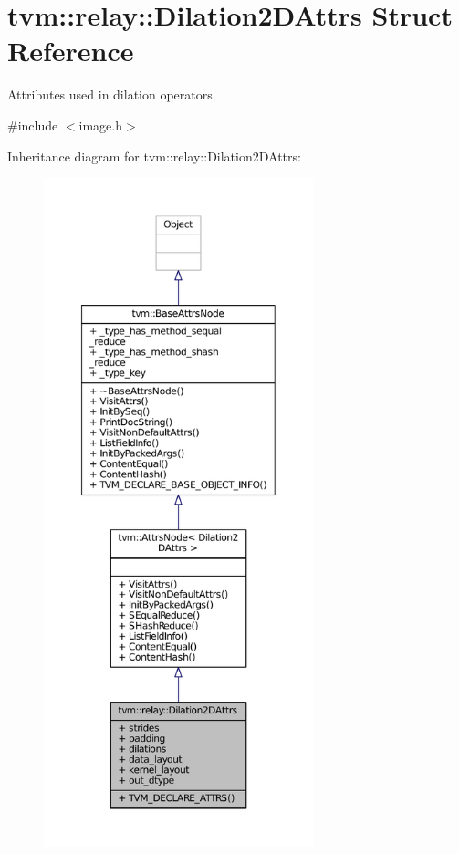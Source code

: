 \hypertarget{structtvm_1_1relay_1_1Dilation2DAttrs}{}\section{tvm\+:\+:relay\+:\+:Dilation2\+D\+Attrs Struct Reference}
\label{structtvm_1_1relay_1_1Dilation2DAttrs}


Attributes used in dilation operators.  




{\ttfamily \#include $<$image.\+h$>$}



Inheritance diagram for tvm\+:\+:relay\+:\+:Dilation2\+D\+Attrs\+:
\nopagebreak
\begin{figure}[H]
\begin{center}
\leavevmode
\includegraphics[height=550pt]{structtvm_1_1relay_1_1Dilation2DAttrs__inherit__graph}
\end{center}
\end{figure}


